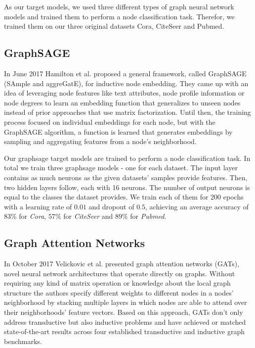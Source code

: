     As our target models, we used three different types of graph neural network models and trained them to perform a node classification task. 
    Therefor, we trained them on our three original datasets Cora, CiteSeer and Pubmed.

    \subsection*{GraphSAGE}
      In June 2017 Hamilton et al.\cite{hamilton2018inductive} proposed a general framework, called GraphSAGE (SAmple and aggreGatE), for inductive node embedding. 
      They came up with an idea of leveraging node features like text attributes, node profile information or node degrees to learn an embedding function that generalizes to unseen nodes instead of prior approaches that use matrix factorization.
      Until then, the training process focused on individual embeddings for each node, but with the GraphSAGE algorithm, a function is learned that generates embeddings by sampling and aggregating features from a node's neighborhood.

      Our graphsage target models are trained to perform a node classification task.
      In total we train three graphsage models - one for each dataset.
      The input layer contains as much neurons as the given datasets' samples provide features.
      Then, two hidden layers follow, each with 16 neurons.
      The number of output neurons is equal to the classes the dataset provides.
      We train each of them for 200 epochs with a learning rate of $0.01$ and dropout of $0.5$, achieving an average accuracy of $83\%$ for \emph{Cora}, $57\%$ for \emph{CiteSeer} and $89\%$ for \emph{Pubmed}.

    \subsection*{Graph Attention Networks}
      In October 2017 Velickovic et al.\cite{gat} presented graph attention networks (GATs), novel neural network architectures that operate directly on graphs.
      Without requiring any kind of matrix operation or knowledge about the local graph structure the authors specify different weights to different nodes in a nodes' neighborhood by stacking multiple layers in which nodes are able to attend over their neighborhoods' feature vectors.
      Based on this approach, GATs don't only address transductive but also inductive problems and have achieved or matched state-of-the-art results across four established transductive and inductive graph benchmarks.

